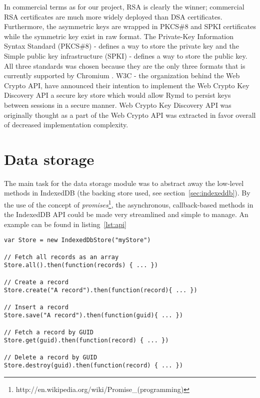In commercial terms as for our project, RSA is clearly the winner; commercial RSA certificates are much more widely deployed than DSA certificates.
Furthermore, the asymmetric keys are wrapped in PKCS\#8 and SPKI certificates while the symmetric key exist in raw format.
The Private-Key Information Syntax Standard (PKCS\#8) -  defines a way to store the private key and the Simple public key infrastructure (SPKI) - defines a way to store the public key.
All three standards was chosen because they are the only three formats that is currently supported by Chromium \cite{ImplementedChromium:Online}.
W3C - the organization behind the Web Crypto API, have announced their intention to implement the Web Crypto Key Discovery API \cite{WebCryptoKeyDiscovery:Online} a secure key store which would allow Rymd to persist keys between sessions in a secure manner.
Web Crypto Key Discovery API was originally thought as a part of the Web Crypto API was extracted in favor overall of decreased implementation complexity.

\section{Data storage}
\label{sec:datastorage}

The main task for the data storage module was to abstract away the low-level methods in IndexedDB (the backing store used, see section~\ref{sec:indexeddb}). By the use of the concept of \emph{promises}\footnote{http://en.wikipedia.org/wiki/Promise\_(programming)}, the asynchronous, callback-based methods in the IndexedDB API could be made very streamlined and simple to manage. An example can be found in listing~\ref{lst:api}

\begin{Code}
\begin{lstlisting}[caption={Common database operations}, label={lst:api}]
var Store = new IndexedDbStore("myStore")

// Fetch all records as an array
Store.all().then(function(records) { ... })

// Create a record
Store.create("A record").then(function(record){ ... })

// Insert a record
Store.save("A record").then(function(guid){ ... })

// Fetch a record by GUID
Store.get(guid).then(function(record) { ... })

// Delete a record by GUID
Store.destroy(guid).then(function(record) { ... })
\end{lstlisting}
\end{Code}

